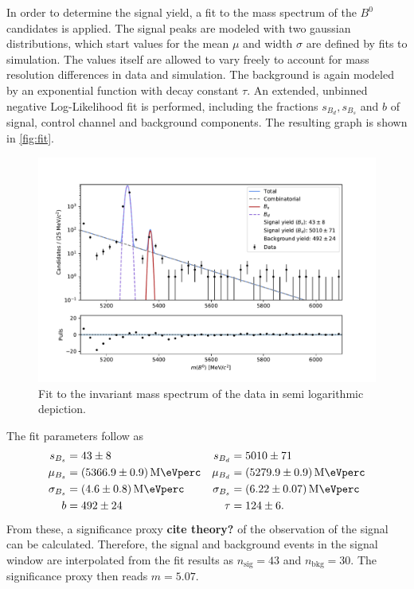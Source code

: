 In order to determine the signal yield, a fit to the mass spectrum of the $B^0$ candidates is applied. 
The signal peaks are modeled with two gaussian distributions, which start values for the mean $\mu$ and width $\sigma$ are defined by fits to simulation. The values itself 
are allowed to vary freely to account for mass resolution differences in data and simulation. 
The background is again modeled by an exponential function with decay constant $\tau$.
An extended, unbinned negative Log-Likelihood fit is performed, including the fractions $s_{B_d}, s_{B_s}$ and $b$ of signal, control channel and background components.
The resulting graph is shown in \autoref{fig:fit}.
\begin{figure}
  \centering
  \includegraphics[width = .9\textwidth]{"content/plots/final_fit.pdf"}
  \caption{Fit to the invariant mass spectrum of the data in semi logarithmic depiction.}
  \label{fig:fit}
\end{figure}
The fit parameters follow as 
\begin{align*}
  s_{B_s} &= \num{43 +- 8} & s_{B_d} &= \num{5010 +- 71} \\
  \mu_{B_s} &= \qty{5366.9 +- 0.9}{\mega\eVperc} & \mu_{B_d} &= \qty{5279.9 +- 0.9}{\mega\eVperc} \\
  \sigma_{B_s} &=  \qty{4.6 +- 0.8}{\mega\eVperc} & \sigma_{B_s} &=  \qty{6.22 +- 0.07}{\mega\eVperc} \\
  b &= \num{492 +- 24}  & \tau &= \num{124 +- 6}.
\end{align*}
From these, a significance proxy \textbf{cite theory?} of the observation of the signal can be calculated.
Therefore, the signal and background events in the signal window are interpolated from the fit results as $n_\text{sig} = \num{43}$ and $n_\text{bkg} = \num{30}$.
The significance proxy then reads $m = \num{5.07}$.
